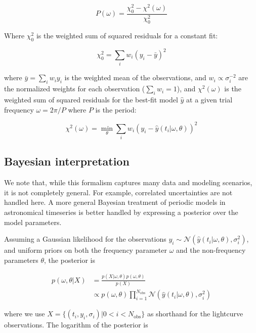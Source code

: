 \documentclass[apj]{emulateapj}
\begin{document}
\begin{equation}
\label{eq:lsp}
P(\omega) = \frac{\chi^2_0 - \chi^2(\omega)}{\chi^2_0}
\end{equation}

Where $\chi^2_0$ is the weighted sum of squared residuals for a constant fit:

\begin{equation}
\chi^2_0 = \sum_i w_i (y_i - \bar{y})^2
\end{equation}

where $\bar{y} = \sum_i w_i y_i$ is the weighted mean of the observations, and
$w_i \propto \sigma_i^{-2}$ are the normalized weights for each observation ($\sum_i w_i = 1$),
and $\chi^2(\omega)$ is the weighted sum of squared residuals for the best-fit model $\hat{y}$ at
a given trial frequency $\omega = 2\pi / P$ where $P$ is the period:

\begin{equation}
\chi^2(\omega) = \min_{\theta} \sum_i w_i (y_i - \hat{y}(t_i| \omega, \theta))^2
\end{equation}

\subsection{Bayesian interpretation}

We note that, while this formalism captures many data and modeling scenarios, it is not completely general. For example, correlated
uncertainties are not handled here. A more general Bayesian treatment of periodic models in astronomical timeseries
is better handled by expressing a posterior over the model parameters.

Assuming a Gaussian likelihood for the observations $y_i \sim \mathcal{N}(\hat{y}( t_i | \omega, \theta), \sigma^2_i)$, and uniform
priors on both the frequency parameter $\omega$ and the non-frequency parameters $\theta$, the posterior is

\begin{align}
    p(\omega, \theta|X) &= \frac{p(X|\omega, \theta)p(\omega, \theta)}{p(X)}\\
                        &\propto p(\omega, \theta) \prod_{i=1}^{N_{\mathrm{obs}}}\mathcal{N}(\hat{y}(t_i | \omega, \theta), \sigma^2_i)
\end{align}

where we use $X = \{(t_i, y_i, \sigma_i) | 0 < i < N_{\mathrm{obs}}\}$ as shorthand for the lightcurve observations. The logarithm of the posterior is
\end{document}
